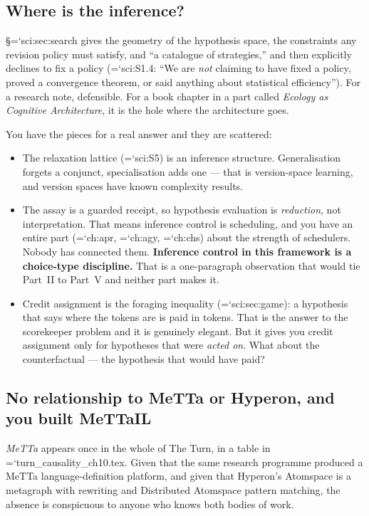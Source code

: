 \documentclass[11pt,letterpaper]{article}
\newcommand{\loc}[1]{{\small\ttfamily\color{accent}\hyphenchar\font=`\-\relax #1}}
\newcommand{\fnd}[1]{\textbf{\color{warn}#1}}
\begin{document}
\subsection*{Where is the inference?}

\S\loc{sci:sec:search} gives the geometry of the hypothesis space, the
constraints any revision policy must satisfy, and ``a catalogue of
strategies,'' and then explicitly declines to fix a policy
(\loc{sci:S1.4}: ``We are \emph{not} claiming to have fixed a policy,
proved a convergence theorem, or said anything about statistical
efficiency''). For a research note, defensible. For a book chapter in
a part called \emph{Ecology as Cognitive Architecture}, it is the hole
where the architecture goes.

You have the pieces for a real answer and they are scattered:

\begin{itemize}[leftmargin=1.2em,itemsep=3pt]
\item The relaxation lattice (\loc{sci:S5}) is an inference structure.
      Generalisation forgets a conjunct, specialisation adds one ---
      that is version-space learning, and version spaces have known
      complexity results.
\item The assay is a guarded receipt, so hypothesis evaluation is
      \emph{reduction}, not interpretation. That means inference
      control is scheduling, and you have an entire part
      (\loc{ch:apr}, \loc{ch:agy}, \loc{ch:chs}) about the strength of
      schedulers. Nobody has connected them. \fnd{Inference control in
      this framework is a choice-type discipline.} That is a
      one-paragraph observation that would tie Part~II to Part~V and
      neither part makes it.
\item Credit assignment is the foraging inequality
      (\loc{sci:sec:game}): a hypothesis that says where the tokens are
      is paid in tokens. That is the answer to the scorekeeper problem
      and it is genuinely elegant. But it gives you credit assignment
      only for hypotheses that were \emph{acted on}. What about the
      counterfactual --- the hypothesis that would have paid?
\end{itemize}

\subsection*{No relationship to MeTTa or Hyperon, and you built MeTTaIL}

\emph{MeTTa} appears once in the whole of The Turn, in a table in
\loc{turn\_causality\_ch10.tex}. Given that the same research
programme produced a MeTTa language-definition platform, and given
that Hyperon's Atomspace is a metagraph with rewriting and Distributed
Atomspace pattern matching, the absence is conspicuous to anyone who
knows both bodies of work.
\end{document}
